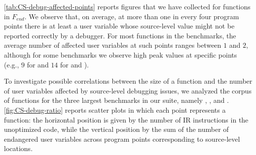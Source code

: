 \mytable\ref{tab:CS-debug-affected-points} reports figures that we have collected for functions in $F_{end}$. We observe that, on average, at more than one in every four program points there is at least a user variable whose source-level value might not be reported correctly by a debugger. For most functions in the benchmarks, the average number of affected user variables at such points ranges between $1$ and $2$, although for some benchmarks we observe high peak values at specific points (e.g., $9$ for  and $14$ for  and ).

To investigate possible correlations between the size of a function and the number of user variables affected by source-level debugging issues, we analyzed the corpus of functions for the three largest benchmarks in our suite, namely , , and . \myfigure\ref{fig:CS-debug-ratio} reports scatter plots in which each point represents a function: the horizontal position is given by the number of IR instructions in the unoptimized code, while the vertical position by the sum of the number of endangered user variables across program points corresponding to source-level locations.

